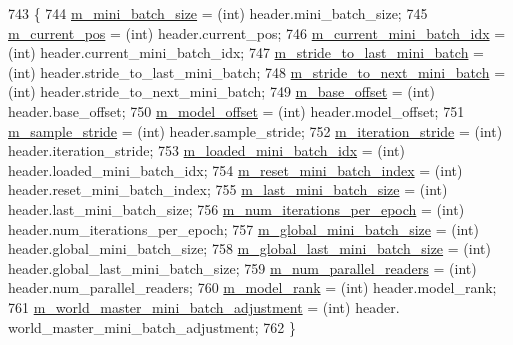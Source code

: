 \begin{DoxyCode}
743                                                    \{
744     \hyperlink{classlbann_1_1generic__data__reader_a96f87a7d09711ab3eee3940ff2aa36ec}{m\_mini\_batch\_size} = (int) header.mini\_batch\_size;
745     \hyperlink{classlbann_1_1generic__data__reader_a2facf4e410099ac8c1fa586e797ec2e0}{m\_current\_pos} = (\textcolor{keywordtype}{int}) header.current\_pos;
746     \hyperlink{classlbann_1_1generic__data__reader_aefd4bc0bf95de1e2500827581acf3536}{m\_current\_mini\_batch\_idx} = (int) header.current\_mini\_batch\_idx;
747     \hyperlink{classlbann_1_1generic__data__reader_ac46922f2ef4f392bcc7c59c21685a3ff}{m\_stride\_to\_last\_mini\_batch} = (\textcolor{keywordtype}{int}) header.stride\_to\_last\_mini\_batch;
748     \hyperlink{classlbann_1_1generic__data__reader_a02c4632cc7cad5c3e4062934c41717a0}{m\_stride\_to\_next\_mini\_batch} = (int) header.stride\_to\_next\_mini\_batch;
749     \hyperlink{classlbann_1_1generic__data__reader_a77946c4dca753c23f39e9a490eba1229}{m\_base\_offset} = (\textcolor{keywordtype}{int}) header.base\_offset;
750     \hyperlink{classlbann_1_1generic__data__reader_a5d9a0efd1ebe43a74911c35ffe84edc9}{m\_model\_offset} = (int) header.model\_offset;
751     \hyperlink{classlbann_1_1generic__data__reader_a58461c39de7e17eafc5b98aec99cbb9b}{m\_sample\_stride} = (\textcolor{keywordtype}{int}) header.sample\_stride;
752     \hyperlink{classlbann_1_1generic__data__reader_a73b23a2e7768db4e9e8ba4d9a362163a}{m\_iteration\_stride} = (int) header.iteration\_stride;
753     \hyperlink{classlbann_1_1generic__data__reader_a2cfc5a3e6de8a8a24d3525ec3ed586fb}{m\_loaded\_mini\_batch\_idx} = (\textcolor{keywordtype}{int}) header.loaded\_mini\_batch\_idx;
754     \hyperlink{classlbann_1_1generic__data__reader_af29f62579a408d1548a124442bcf181d}{m\_reset\_mini\_batch\_index} = (int) header.reset\_mini\_batch\_index;
755     \hyperlink{classlbann_1_1generic__data__reader_a241f77b6209de4ae656bc34ad51bb612}{m\_last\_mini\_batch\_size} = (\textcolor{keywordtype}{int}) header.last\_mini\_batch\_size;
756     \hyperlink{classlbann_1_1generic__data__reader_ab570063483a1f604ca2fc536c3d83de7}{m\_num\_iterations\_per\_epoch} = (int) header.num\_iterations\_per\_epoch;
757     \hyperlink{classlbann_1_1generic__data__reader_a7cd8fa7b1db9ea3d154a411f36992476}{m\_global\_mini\_batch\_size} = (\textcolor{keywordtype}{int}) header.global\_mini\_batch\_size;
758     \hyperlink{classlbann_1_1generic__data__reader_a1d6f2d378a3f152e20b3def16f52c003}{m\_global\_last\_mini\_batch\_size} = (int) header.global\_last\_mini\_batch\_size;
759     \hyperlink{classlbann_1_1generic__data__reader_a6eb9b8c7c704374a1e49dce87110455e}{m\_num\_parallel\_readers} = (\textcolor{keywordtype}{int}) header.num\_parallel\_readers;
760     \hyperlink{classlbann_1_1generic__data__reader_a5e89d5e6797f7e7b69d1a64f7d8b5d6b}{m\_model\_rank} = (int) header.model\_rank;
761     \hyperlink{classlbann_1_1generic__data__reader_acd33b2dbdfd4043ecc62cc13789532a2}{m\_world\_master\_mini\_batch\_adjustment} = (\textcolor{keywordtype}{int}) header.
      world\_master\_mini\_batch\_adjustment;
762   \}
\end{DoxyCode}
